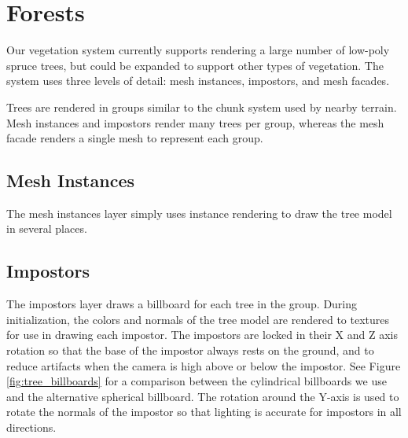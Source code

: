 \section{Forests} \label{forests} %

Our vegetation system currently supports rendering a large number of low-poly spruce trees, but could be expanded to support other types of vegetation.
The system uses three levels of detail: mesh instances, impostors, and mesh facades.

Trees are rendered in groups similar to the chunk system used by nearby terrain.
Mesh instances and impostors render many trees per group, whereas the mesh facade renders a single mesh to represent each group.

\subsection{Mesh Instances}

The mesh instances layer simply uses instance rendering to draw the tree model in several places.

\subsection{Impostors}

The impostors layer draws a billboard for each tree in the group.
During initialization, the colors and normals of the tree model are rendered to textures for use in drawing each impostor.
The impostors are locked in their X and Z axis rotation so that the base of the impostor always rests on the ground, and to reduce artifacts when the camera is high above or below the impostor.
See Figure \ref{fig:tree_billboards} for a comparison between the cylindrical billboards we use and the alternative spherical billboard.
The rotation around the Y-axis is used to rotate the normals of the impostor so that lighting is accurate for impostors in all directions.

